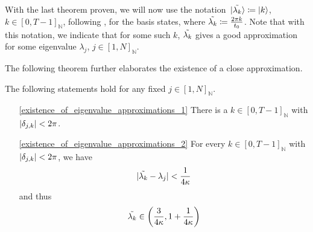 \begin{remark} \label{eigenvalue_approximations_notation}
    With the last theorem proven, we will now use the notation \(\ket*{\tilde{\lambda_k}} \coloneqq \ket{k}\), \(k \in [0, T-1]_{\mathbb{N}}\), following \cite[p. 6]{Harrow2008}, for the basis states, where \(\tilde{\lambda_k} \coloneqq \frac{2 \pi k}{t_0}\). Note that with this notation, we indicate that for some such \(k\), \(\tilde{\lambda_k}\) gives a good approximation for some eigenvalue \(\lambda_j\), \(j \in [1, N]_{\mathbb{N}}\).
\end{remark}

The following theorem further elaborates the existence of a close approximation.

\begin{theorem} \label{existence_of_eigenvalue_approximations}
    The following statements hold for any fixed \(j \in [1, N]_{\mathbb{N}}\).
    \begin{enumerate}[label=(\roman*)]
        \item[\ref{existence_of_eigenvalue_approximations_1}] There is a \(k \in [0, T-1]_{\mathbb{N}}\) with \(|\delta_{j, k}| < 2\pi\).
        \item[\ref{existence_of_eigenvalue_approximations_2}] For every \(k \in [0, T-1]_{\mathbb{N}}\) with \(|\delta_{j, k}| < 2\pi\), we have
        \begin{align}
            |\tilde{\lambda_k} - \lambda_j| < \frac{1}{4\kappa}
        \end{align}
        and thus
        \begin{align}
            \tilde{\lambda_k} \in \left(\frac{3}{4\kappa}, 1 + \frac{1}{4\kappa}\right)
        \end{align}
    \end{enumerate}
\end{theorem}

